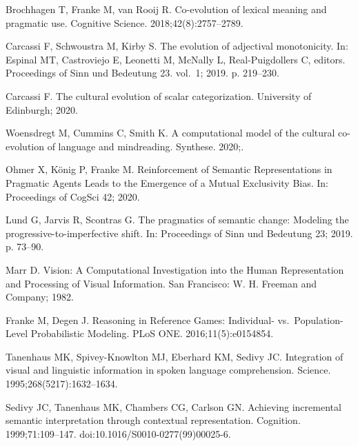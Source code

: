 \documentclass[10pt,letterpaper]{article}
\begin{document}
\begin{thebibliography}{10}
Brochhagen T, Franke M, van Rooij R.
\newblock Co-evolution of lexical meaning and pragmatic use.
\newblock Cognitive Science. 2018;42(8):2757--2789.

Carcassi F, Schwoustra M, Kirby S.
\newblock The evolution of adjectival monotonicity.
\newblock In: Espinal MT, Castroviejo E, Leonetti M, McNally L,
  Real-Puigdollers C, editors. Proceedings of {S}inn und {B}edeutung 23.
  vol.~1; 2019. p. 219--230.

Carcassi F.
\newblock The cultural evolution of scalar categorization.
\newblock University of Edinburgh; 2020.

Woensdregt M, Cummins C, Smith K.
\newblock A computational model of the cultural co-evolution of language and
  mindreading.
\newblock Synthese. 2020;.

Ohmer X, K\"{o}nig P, Franke M.
\newblock Reinforcement of Semantic Representations in Pragmatic Agents Leads
  to the Emergence of a Mutual Exclusivity Bias.
\newblock In: Proceedings of {CogSci} 42; 2020.

Lund G, Jarvis R, Scontras G.
\newblock The pragmatics of semantic change: Modeling the
  progressive-to-imperfective shift.
\newblock In: Proceedings of {Sinn und Bedeutung} 23; 2019. p. 73--90.

Marr D.
\newblock Vision: A Computational Investigation into the Human Representation
  and Processing of Visual Information.
\newblock San Francisco: W. H. Freeman and Company; 1982.

Franke M, Degen J.
\newblock Reasoning in Reference Games: {I}ndividual- vs.~Population-Level
  Probabilistic Modeling.
\newblock PLoS ONE. 2016;11(5):e0154854.

Tanenhaus MK, Spivey-Knowlton MJ, Eberhard KM, Sedivy JC.
\newblock Integration of visual and linguistic information in spoken language
  comprehension.
\newblock Science. 1995;268(5217):1632--1634.

Sedivy JC, Tanenhaus MK, Chambers CG, Carlson GN.
\newblock Achieving incremental semantic interpretation through contextual
  representation.
\newblock Cognition. 1999;71:109--147.
\newblock doi:{10.1016/S0010-0277(99)00025-6}.


\end{thebibliography}
\end{document}
